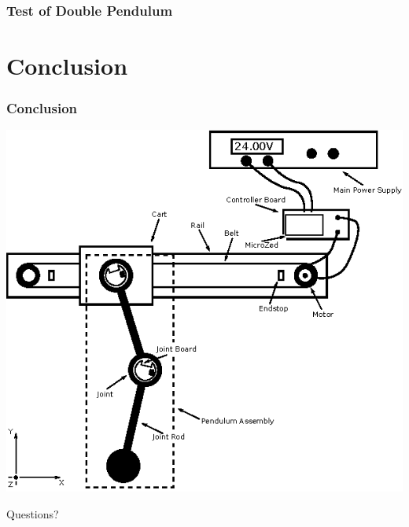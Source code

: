 \documentclass[mathserif]{beamer}
\begin{document}
\begin{frame}[c]\frametitle{Test of Double Pendulum}
    \begin{figure}[h]
		\centering
		
	\end{figure}
\end{frame}

\section{Conclusion}

\begin{frame}[t]\frametitle{Conclusion}
	\centering
	\includegraphics[scale=1.1]{graphics/system_overview}
\end{frame}

\begin{frame}[standout]
  Questions?
\end{frame}
\end{document}
